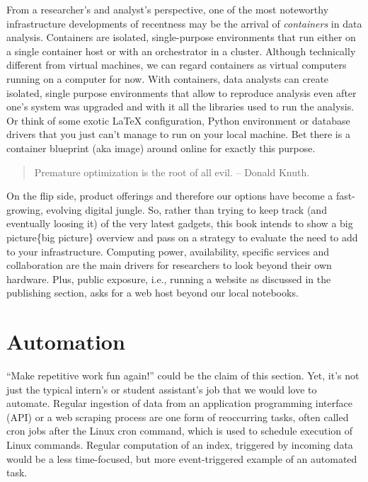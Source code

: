 \documentclass[
  12pt,
  letterpaper,
]{krantz}
\begin{document}
From a researcher's and analyst's perspective, one of the most
noteworthy infrastructure developments of
recentness may be the arrival of \emph{containers} in data analysis.
Containers are isolated, single-purpose environments that run either on
a single container host or with an orchestrator in a cluster. Although
technically different from virtual machines, we can regard containers as
virtual computers running on a computer for now. With containers, data
analysts can create isolated, single purpose environments that allow to
reproduce analysis even after one's system was upgraded and with it all
the libraries used to run the analysis. Or think of some exotic LaTeX
configuration, Python environment or database drivers
that you just can't manage to run on your local machine. Bet there is a
container blueprint (aka image) around online for exactly this purpose.

\begin{quote}
Premature optimization is the root of all evil. -- Donald Knuth.
\end{quote}

On the flip side, product offerings and therefore our options have
become a fast-growing, evolving digital jungle. So, rather than trying
to keep track (and eventually loosing it) of the very latest gadgets,
this book intends to show a big picture\{big picture\} overview and pass
on a strategy to evaluate the need to add to your
infrastructure. Computing power, availability,
specific services and collaboration are the main drivers for researchers
to look beyond their own hardware. Plus, public exposure, i.e., running
a website as discussed in the publishing section, asks for a web host
beyond our local notebooks.

\hypertarget{automation}{%
\section{\texorpdfstring{Automation}{Automation}}\label{automation}}

``Make repetitive work fun again!'' could be the claim of this section.
Yet, it's not just the typical intern's or student assistant's job that
we would love to automate. Regular ingestion of data from an application
programming interface (API) or a web scraping process are one form of
reoccurring tasks, often called cron jobs after the Linux cron command,
which is used to schedule execution of Linux commands. Regular
computation of an index, triggered by incoming data would be a less
time-focused, but more event-triggered example of an automated task.
\end{document}
